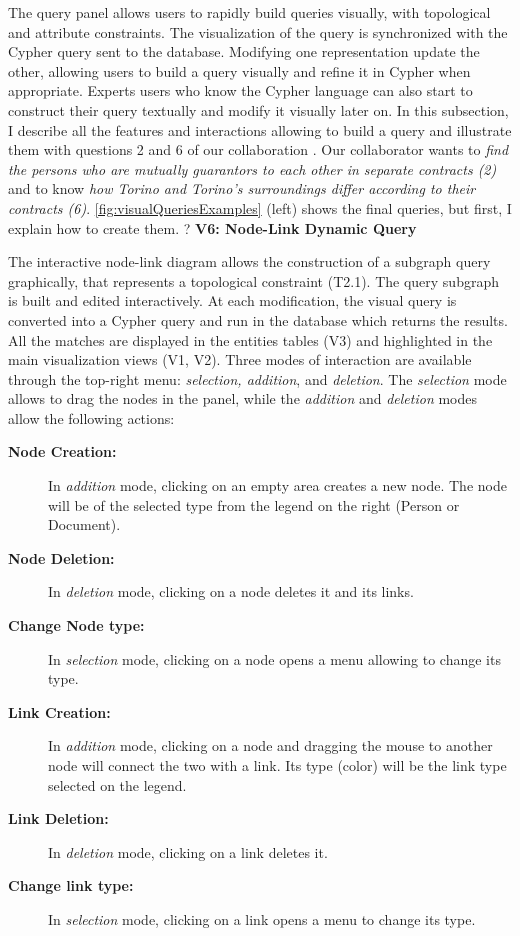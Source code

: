 The query panel allows users to rapidly build queries visually, with topological and attribute constraints.
The visualization of the query is synchronized with the Cypher query sent to the database.
Modifying one representation update the other, allowing users to build a query visually and refine it in Cypher when appropriate.
Experts users who know the Cypher language can also start to construct their query textually and modify it visually later on.
In this subsection, I describe all the features and interactions allowing \name to build a query and illustrate them with questions 2 and 6 of our collaboration \pascal.
Our collaborator wants to \textit{find the persons who are mutually guarantors to each other in separate contracts (2)} and to know \textit{how Torino and Torino's surroundings differ according to their contracts (6)}.
\autoref{fig:visualQueriesExamples} (left) shows the final queries, but first, I explain how to create them.
?
\noindent\textbf{V6: Node-Link Dynamic Query}

The interactive node-link diagram allows the construction of a subgraph query graphically, that represents a topological constraint (T2.1).
The query subgraph is built and edited interactively.
At each modification, the visual query is converted into a Cypher query and run in the database which returns the results.
All the matches are displayed in the entities tables (V3) and highlighted in the main visualization views (V1, V2).
Three modes of interaction are available through the top-right menu: \textit{selection, addition}, and \textit{deletion}.
The \textit{selection} mode allows to drag the nodes in the panel, while the \textit{addition} and \textit{deletion} modes allow the following actions:
\begin{description}
    \item[\textbf{Node Creation:}] In \textit{addition} mode, clicking on an empty area creates a new node. The node will be of the selected type from the legend on the right (Person or Document).
    \item[\textbf{Node Deletion:}] In \textit{deletion} mode, clicking on a node deletes it and its links.
    \item[\textbf{Change Node type:}]  In \textit{selection} mode, clicking on a node opens a menu allowing to change its type.
    \item[\textbf{Link Creation:}] In \textit{addition} mode, clicking on a node and dragging the mouse to another node will connect the two with a link. Its type (color) will be the link type selected on the legend.
    \item[\textbf{Link Deletion:}] In \textit{deletion} mode, clicking on a link deletes it.
    \item[\textbf{Change link type:}] In \textit{selection} mode, clicking on a link opens a menu to change its type.
\end{description}

